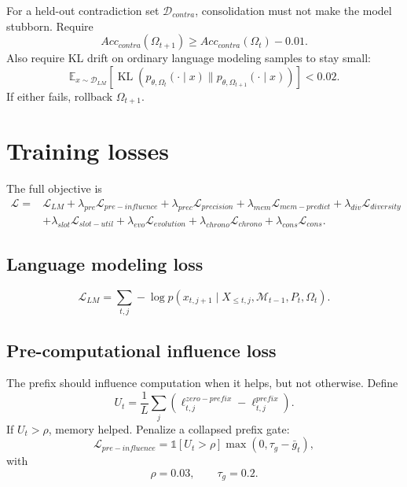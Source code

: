 \documentclass[11pt]{article}
\newcommand{\E}{\mathbb{E}}
\newcommand{\KL}{\operatorname{KL}}
\newcommand{\Mem}{\mathcal{M}}
\begin{document}
For a held-out contradiction set \(\mathcal{D}_{contra}\), consolidation must not make the model stubborn. Require
\begin{equation}
    Acc_{contra}(\Omega_{t+1})\ge Acc_{contra}(\Omega_t)-0.01.
\end{equation}
Also require KL drift on ordinary language modeling samples to stay small:
\begin{equation}
    \E_{x\sim\mathcal{D}_{LM}}\left[\KL(p_{\theta,\Omega_t}(\cdot\mid x)\|p_{\theta,\Omega_{t+1}}(\cdot\mid x))\right]<0.02.
\end{equation}
If either fails, rollback \(\Omega_{t+1}\).

\section{Training losses}

The full objective is
\begin{equation}
\begin{split}
    \mathcal{L} ={}& \mathcal{L}_{LM}
    +\lambda_{pre}\mathcal{L}_{pre-influence}
    +\lambda_{prec}\mathcal{L}_{precision}
    +\lambda_{mem}\mathcal{L}_{mem-predict}
    +\lambda_{div}\mathcal{L}_{diversity}\\
    &+\lambda_{slot}\mathcal{L}_{slot-util}
    +\lambda_{evo}\mathcal{L}_{evolution}
    +\lambda_{chrono}\mathcal{L}_{chrono}
    +\lambda_{cons}\mathcal{L}_{cons}.
\end{split}
\end{equation}

\subsection{Language modeling loss}

\begin{equation}
    \mathcal{L}_{LM}=\sum_{t,j}-\log p(x_{t,j+1}\mid X_{\le t,j},\Mem_{t-1},P_t,\Omega_t).
\end{equation}

\subsection{Pre-computational influence loss}

The prefix should influence computation when it helps, but not otherwise. Define
\begin{equation}
    U_t=\frac{1}{L}\sum_j\left(\ell^{zero-prefix}_{t,j}-\ell^{prefix}_{t,j}\right).
\end{equation}
If \(U_t>\rho\), memory helped. Penalize a collapsed prefix gate:
\begin{equation}
    \mathcal{L}_{pre-influence}=\mathbb{1}[U_t>\rho]\max(0,\tau_g-\bar{g}_t),
\end{equation}
with
\begin{equation}
    \rho=0.03,\qquad \tau_g=0.2.
\end{equation}
\end{document}
